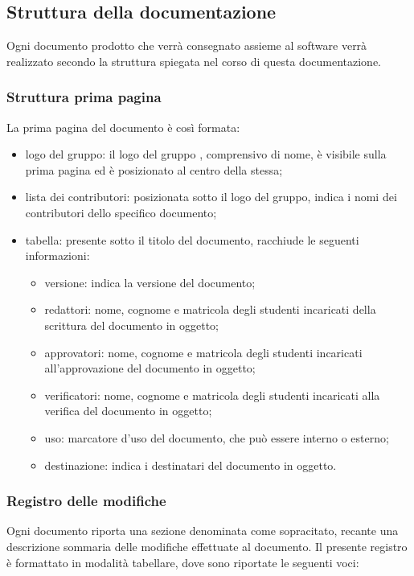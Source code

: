 \subsection{Struttura della documentazione}
Ogni documento prodotto che verrà consegnato assieme al software \NomeProgetto{} verrà realizzato secondo la struttura spiegata nel corso di questa documentazione.


\subsubsection{Struttura prima pagina}
La prima pagina del documento è così formata:
\begin{itemize}
	\item logo del gruppo: il logo del gruppo {\Gruppo}, comprensivo di nome, è visibile sulla prima pagina ed è posizionato al centro della stessa;
	\item lista dei contributori: posizionata sotto il logo del gruppo, indica i nomi dei contributori dello specifico documento;

	\item tabella: presente sotto il titolo del documento, racchiude le seguenti informazioni:
	\begin{itemize}
		\item versione: indica la versione del documento;
		\item redattori: nome, cognome e matricola degli studenti incaricati della scrittura del documento in oggetto;
		\item approvatori: nome, cognome e matricola degli studenti incaricati all’approvazione del documento in oggetto;
		\item verificatori: nome, cognome e matricola degli studenti incaricati alla verifica del documento in oggetto;
		\item uso: marcatore d’uso del documento, che può essere interno o esterno;
		\item destinazione: indica i destinatari del documento in oggetto.
		\end{itemize}
	\end{itemize}
	
\subsubsection{Registro delle modifiche}
Ogni documento riporta una sezione denominata come sopracitato, recante una descrizione sommaria delle modifiche effettuate al documento. Il presente registro è formattato in modalità tabellare, dove sono riportate le seguenti voci:	

